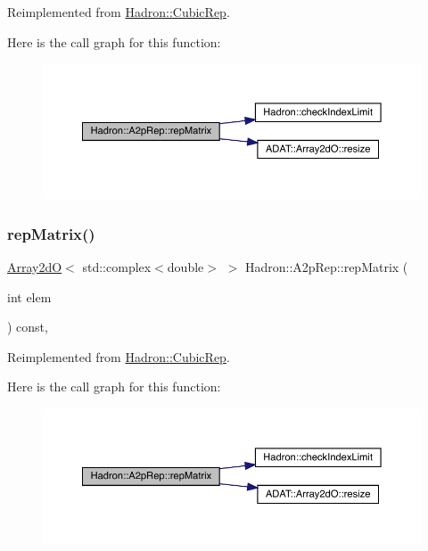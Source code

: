Reimplemented from \mbox{\hyperlink{structHadron_1_1CubicRep_ac5d7e9e6f4ab1158b5fce3e4ad9e8005}{Hadron\+::\+Cubic\+Rep}}.

Here is the call graph for this function\+:
\nopagebreak
\begin{figure}[H]
\begin{center}
\leavevmode
\includegraphics[width=350pt]{d4/d33/structHadron_1_1A2pRep_aeede31465f59cff568c2ada0aa32ac37_cgraph}
\end{center}
\end{figure}
\mbox{\label{structHadron_1_1A2pRep_aeede31465f59cff568c2ada0aa32ac37}} 
\subsubsection{\texorpdfstring{repMatrix()}{repMatrix()}\hspace{0.1cm}{\footnotesize\ttfamily [3/3]}}
{\footnotesize\ttfamily \mbox{\hyperlink{classADAT_1_1Array2dO}{Array2dO}}$<$ std\+::complex$<$double$>$ $>$ Hadron\+::\+A2p\+Rep\+::rep\+Matrix (\begin{DoxyParamCaption}\item[{int}]{elem }\end{DoxyParamCaption}) const\hspace{0.3cm}{\ttfamily [inline]}, {\ttfamily [virtual]}}



Reimplemented from \mbox{\hyperlink{structHadron_1_1CubicRep_ac5d7e9e6f4ab1158b5fce3e4ad9e8005}{Hadron\+::\+Cubic\+Rep}}.

Here is the call graph for this function\+:
\nopagebreak
\begin{figure}[H]
\begin{center}
\leavevmode
\includegraphics[width=350pt]{d4/d33/structHadron_1_1A2pRep_aeede31465f59cff568c2ada0aa32ac37_cgraph}
\end{center}
\end{figure}


